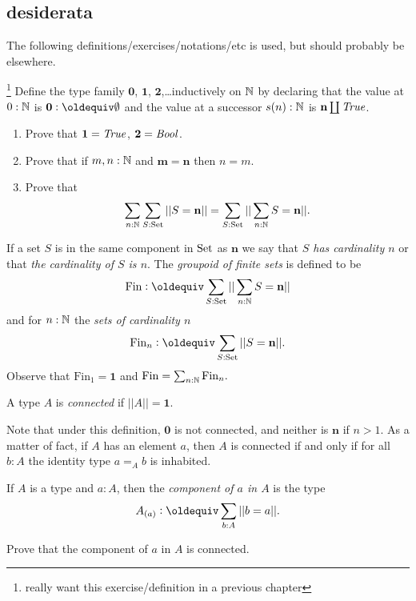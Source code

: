 \label{ch:groups}

\subsection{desiderata}
The following definitions/exercises/notations/etc is used, but should probably be elsewhere.

\newcommand{\fin}{\mathrm{Fin}}
\begin{definition}\label{def:finiteset}
  \footnote{really want this exercise/definition in a previous chapter} Define the type family $\mathbf 0$, $\mathbf 1$, $\mathbf 2$,\dots inductively on $\mathbb{N}$ by declaring that the value at $0:\mathbb{N}$ is $\mathbf 0\defequi\emptyset$ and the value at a successor $s(n):\mathbb{N}$ is $\mathbf n\coprod\mathop{\mathit{True}}$.  
  \begin{enumerate}
  \item Prove that $\mathbf 1=\mathop{\mathit{True}}$, $\mathbf 2=\mathop{\mathit{Bool}}$. 
  \item Prove that if $m,n:\mathbb{N}$ and $\mathbf m=\mathbf n$ then $n=m$.  
  \item   Prove that
$$\sum_{n:\mathbb{N}}\sum_{S:\mathord{\mathrm{Set}}}||S=\mathbf n|| =\sum_{S:\mathord{\mathrm{Set}}}||\sum_{n:\mathbb{N}}S=\mathbf n||.
$$
  \end{enumerate}
If a set $S$ is in the same component in $\mathord{\mathrm{Set}}$ as $\mathbf n$ we say that \emph{$S$ has cardinality $n$} or that \emph{the cardinality of $S$ is $n$}.
The \emph{groupoid of finite sets} is defined to be
$$\fin\defequi\sum_{S:\Set}||\sum_{n:\NN}S=\mathbf n||$$
and for $n:\mathbb{N}$ the \emph{sets of cardinality $n$}
$$\fin_n\defequi \sum_{S:\Set}||S=\mathbf n||.$$
Observe that $\fin_1=\mathbf 1$ and $\fin=\sum_{n:\NN}\fin_n.$

\begin{definition}\label{def:connected}
A type $A$ is \emph{connected} if $||A||%
=\mathbf 1$.  
\end{definition}
Note that under this definition, $\mathbf 0$ is not connected, and neither is $\mathbf n$ if $n>1$.  As a matter of fact, if $A$ has an element $a$, then $A$ is connected if and only if for all $b:A$ the identity type $a=_Ab$ is inhabited.
\begin{definition}
    If $A$ is a type and $a:A$, then the \emph{component of $a$ in $A$} is the type
$$A_{(a)}\defequi \sum_{b:A}||b=a||.$$
\end{definition}
\begin{xca}
  Prove that the component of $a$ in $A$ is connected.  


\end{xca}
\end{definition}
